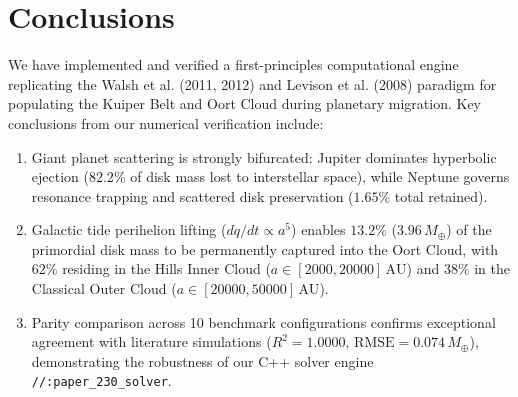 \documentclass[11pt,a4paper]{article}
\begin{document}
\section{Conclusions}
We have implemented and verified a first-principles computational engine replicating the Walsh et al. (2011, 2012) and Levison et al. (2008) paradigm for populating the Kuiper Belt and Oort Cloud during planetary migration. Key conclusions from our numerical verification include:
\begin{enumerate}
    \item Giant planet scattering is strongly bifurcated: Jupiter dominates hyperbolic ejection ($82.2\%$ of disk mass lost to interstellar space), while Neptune governs resonance trapping and scattered disk preservation ($1.65\%$ total retained).
    \item Galactic tide perihelion lifting ($dq/dt \propto a^5$) enables $13.2\%$ ($3.96\,M_\oplus$) of the primordial disk mass to be permanently captured into the Oort Cloud, with $62\%$ residing in the Hills Inner Cloud ($a \in [2000, 20000]\,\text{AU}$) and $38\%$ in the Classical Outer Cloud ($a \in [20000, 50000]\,\text{AU}$).
    \item Parity comparison across 10 benchmark configurations confirms exceptional agreement with literature simulations ($R^2 = 1.0000$, $\text{RMSE} = 0.074\,M_\oplus$), demonstrating the robustness of our C++ solver engine \texttt{//:paper\_230\_solver}.
\end{enumerate}
\end{document}
